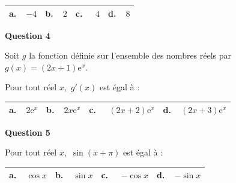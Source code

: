 \begin{center}
\begin{tabularx}{\linewidth}{|*{4}{X|}}\hline
\textbf{a.~~}$- 4$&\textbf{b.~~}$2$&\textbf{c.~~} $4$&\textbf{d.~~}$8$\\ \hline
\end{tabularx}
\end{center}

\textbf{Question 4}

Soit $g$ la fonction définie sur l'ensemble des nombres réels par $g(x) = (2x + 1)\text{e}^x$.

Pour tout réel $x$,\, $g'(x)$ est égal à :

\begin{center}
\begin{tabularx}{\linewidth}{|*{4}{X|}}\hline
\textbf{a.~~}$2\text{e}^x$&\textbf{b.~~}$2x\text{e}^x$&\textbf{c.~~} $ (2x +2)\text{e}^x$&
\textbf{d.~~}$(2x +3)\text{e}^x$\\ \hline
\end{tabularx}
\end{center}

\textbf{Question 5}

Pour tout réel $x$,\, $\sin(x + \pi)$ est égal à :

\begin{center}
\begin{tabularx}{\linewidth}{|*{4}{X|}}\hline
\textbf{a.~~}$\cos x$&\textbf{b.~~}$\sin x$&\textbf{c.~~} $- \cos x$&\textbf{d.~~}$- \sin x$\\ \hline
\end{tabularx}
\end{center}

\bigskip
